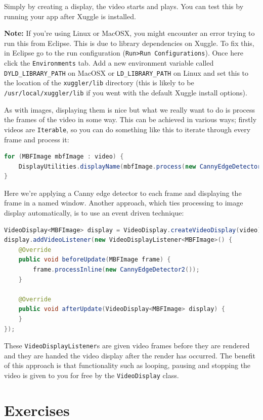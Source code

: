 \documentclass[10pt,a4paper,twoside,extrafontsizes]{memoir}
\begin{document}
Simply by creating a display, the video starts and plays. You can test this by running 
your app after Xuggle is installed. 

\textbf{Note:} If you're using Linux or MacOSX, you might encounter an error trying to run this from Eclipse. 
This is due to library dependencies on Xuggle. To fix this, in Eclipse go to the run configuration 
(\verb+Run>Run Configurations+). Once here click the \verb+Environments+ tab. Add a new environment 
variable called \verb+DYLD_LIBRARY_PATH+ on MacOSX or \verb+LD_LIBRARY_PATH+ on Linux and set this to 
the location of the \verb+xuggler/lib+ directory (this is likely to be \verb+/usr/local/xuggler/lib+
if you went with the default Xuggle install options).

As with images, displaying them is nice but what we really want to do is process the frames of 
the video in some way. This can be achieved in various ways; firstly videos are \verb+Iterable+, so you can 
do something like this to iterate through every frame and process it:
\begin{lstlisting}[language=java]
for (MBFImage mbfImage : video) {
    DisplayUtilities.displayName(mbfImage.process(new CannyEdgeDetector2()), "videoFrames");
}
\end{lstlisting}
Here we're applying a Canny edge detector to each frame and displaying the frame in a named window. Another 
approach, which ties processing to image display automatically, is to use an event driven technique:
\begin{lstlisting}[language=java]
VideoDisplay<MBFImage> display = VideoDisplay.createVideoDisplay(video);
display.addVideoListener(new VideoDisplayListener<MBFImage>() {
    @Override
    public void beforeUpdate(MBFImage frame) {
        frame.processInline(new CannyEdgeDetector2());
    }

    @Override
    public void afterUpdate(VideoDisplay<MBFImage> display) {
    }
});
\end{lstlisting}

These \verb+VideoDisplayListener+s are given video frames before they are rendered and they are handed the 
video display after the render has occurred. The benefit of this approach is that functionality such as 
looping, pausing and stopping the video is given to you for free by the \verb+VideoDisplay+ class. 

\section*{Exercises}
\end{document}
